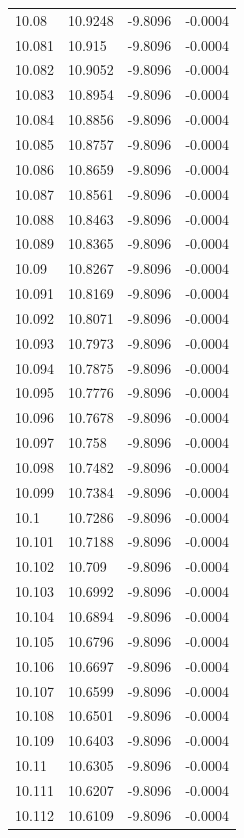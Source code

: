 \begin{tabular}{llll}
10.08 & 10.9248 & -9.8096 & -0.0004 \\
10.081 & 10.915 & -9.8096 & -0.0004 \\
10.082 & 10.9052 & -9.8096 & -0.0004 \\
10.083 & 10.8954 & -9.8096 & -0.0004 \\
10.084 & 10.8856 & -9.8096 & -0.0004 \\
10.085 & 10.8757 & -9.8096 & -0.0004 \\
10.086 & 10.8659 & -9.8096 & -0.0004 \\
10.087 & 10.8561 & -9.8096 & -0.0004 \\
10.088 & 10.8463 & -9.8096 & -0.0004 \\
10.089 & 10.8365 & -9.8096 & -0.0004 \\
10.09 & 10.8267 & -9.8096 & -0.0004 \\
10.091 & 10.8169 & -9.8096 & -0.0004 \\
10.092 & 10.8071 & -9.8096 & -0.0004 \\
10.093 & 10.7973 & -9.8096 & -0.0004 \\
10.094 & 10.7875 & -9.8096 & -0.0004 \\
10.095 & 10.7776 & -9.8096 & -0.0004 \\
10.096 & 10.7678 & -9.8096 & -0.0004 \\
10.097 & 10.758 & -9.8096 & -0.0004 \\
10.098 & 10.7482 & -9.8096 & -0.0004 \\
10.099 & 10.7384 & -9.8096 & -0.0004 \\
10.1 & 10.7286 & -9.8096 & -0.0004 \\
10.101 & 10.7188 & -9.8096 & -0.0004 \\
10.102 & 10.709 & -9.8096 & -0.0004 \\
10.103 & 10.6992 & -9.8096 & -0.0004 \\
10.104 & 10.6894 & -9.8096 & -0.0004 \\
10.105 & 10.6796 & -9.8096 & -0.0004 \\
10.106 & 10.6697 & -9.8096 & -0.0004 \\
10.107 & 10.6599 & -9.8096 & -0.0004 \\
10.108 & 10.6501 & -9.8096 & -0.0004 \\
10.109 & 10.6403 & -9.8096 & -0.0004 \\
10.11 & 10.6305 & -9.8096 & -0.0004 \\
10.111 & 10.6207 & -9.8096 & -0.0004 \\
10.112 & 10.6109 & -9.8096 & -0.0004 \\

\end{tabular}
